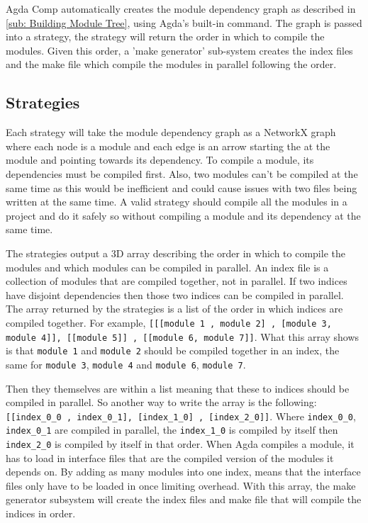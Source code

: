 Agda Comp automatically creates the module dependency graph as described in
\cref{sub: Building Module Tree}, using Agda's built-in command. The graph is
passed into a strategy, the strategy will return the order in which to compile
the modules. Given this order, a 'make generator' sub-system creates the index
files and the make file which compile the modules in parallel following the
order.

\subsection{Strategies}

Each strategy will take the module dependency graph as a NetworkX graph where
each node is a module and each edge is an arrow starting the at the module and
pointing towards its dependency. To compile a module, its dependencies must be
compiled first. Also, two modules can't be compiled at the same time as this
would be inefficient and could cause issues with two files being written at the
same time. A valid strategy should compile all the modules in a project and do
it safely so without compiling a module and its dependency at the same time. 

The strategies output a 3D array describing the order in which to compile the
modules and which modules can be compiled in parallel. An index file is a
collection of modules that are compiled together, not in parallel. If two
indices have disjoint dependencies then those two indices can be compiled in
parallel. The array returned by the strategies is a list of the order in which
indices are compiled together. For example, \texttt{[[[module 1 , module 2] ,
[module 3, module 4]], [[module 5]] , [[module 6, module 7]]}. What this array
shows is that \texttt{module 1} and \texttt{module 2} should be compiled
together in an index, the same for \texttt{module 3}, \texttt{module 4} and
\texttt{module 6}, \texttt{module 7}. 

Then they themselves are within a list meaning that these to indices should be
compiled in parallel. So another way to write the array is the following:
\texttt{[[index\_0\_0 , index\_0\_1], [index\_1\_0] , [index\_2\_0]]}. Where
\texttt{index\_0\_0}, \texttt{index\_0\_1} are compiled in parallel, the
\texttt{index\_1\_0} is compiled by itself then \texttt{index\_2\_0} is
compiled by itself in that order. When Agda compiles a module, it has to load
in interface files that are the compiled version of the modules it depends on.
By adding as many modules into one index, means that the interface files only
have to be loaded in once limiting overhead. With this array, the make
generator subsystem will create the index files and make file that will compile
the indices in order.

